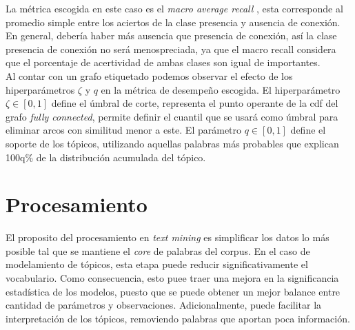 \documentclass[letterpaper,12pt,oneside]{book} %
\begin{document}
La métrica escogida en este caso es el \textit{macro average recall} \citep{forman2003extensive}, esta corresponde al promedio simple entre los aciertos de la clase presencia y ausencia de conexión. En general, debería haber más ausencia que presencia de conexión, así la clase presencia de conexión no será menospreciada, ya que el macro recall considera que el porcentaje de acertividad de ambas clases son igual de importantes.\\

Al contar con un grafo etiquetado podemos observar el efecto de los hiperparámetros $\zeta$ y $q$ en la métrica de desempeño escogida. El hiperparámetro $\zeta\in[0,1]$ define el úmbral de corte, representa el punto operante de la cdf del grafo \textit{fully connected}, permite definir el cuantil que se usará como úmbral para eliminar arcos con similitud menor a este. El parámetro $q \in [0,1]$ define el soporte de los tópicos, utilizando aquellas palabras más probables que explican 100q\% de la distribución acumulada del tópico. 

\section{Procesamiento}

El proposito del procesamiento en \textit{text mining} es simplificar los datos lo más posible tal que se mantiene el \textit{core} de palabras del corpus. En el caso de modelamiento de tópicos, esta etapa puede reducir significativamente el vocabulario. Como consecuencia, esto puee traer una mejora en la significancia estadística de los modelos, puesto que se puede obtener un mejor balance entre cantidad de parámetros y observaciones. Adicionalmente, puede facilitar la interpretación de los tópicos, removiendo palabras que aportan poca información.\\
\end{document}
